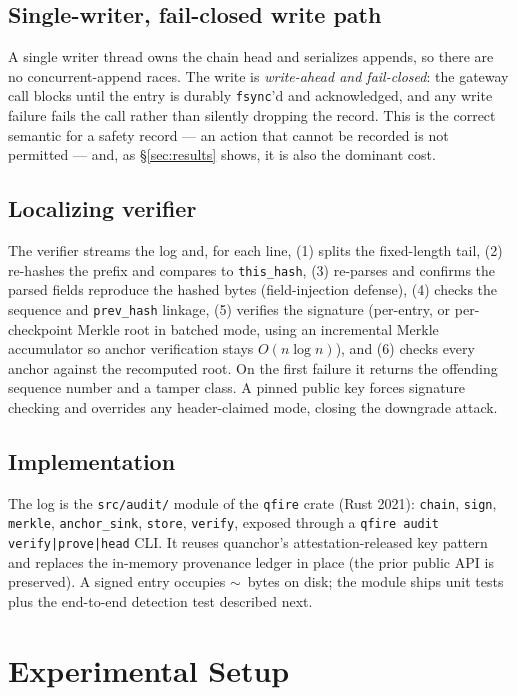 \documentclass[11pt]{article}
\begin{document}
\subsection{Single-writer, fail-closed write path}
A single writer thread owns the chain head and serializes appends, so there are no
concurrent-append races. The write is \emph{write-ahead and fail-closed}: the
gateway call blocks until the entry is durably \texttt{fsync}'d and acknowledged,
and any write failure fails the call rather than silently dropping the record. This
is the correct semantic for a safety record --- an action that cannot be recorded is
not permitted --- and, as \S\ref{sec:results} shows, it is also the dominant cost.

\subsection{Localizing verifier}
The verifier streams the log and, for each line, (1) splits the fixed-length tail,
(2) re-hashes the prefix and compares to \texttt{this\_hash}, (3) re-parses and
confirms the parsed fields reproduce the hashed bytes (field-injection defense),
(4) checks the sequence and \texttt{prev\_hash} linkage, (5) verifies the signature
(per-entry, or per-checkpoint Merkle root in batched mode, using an incremental
Merkle accumulator so anchor verification stays $O(n\log n)$), and (6) checks every
anchor against the recomputed root. On the first failure it returns the offending
sequence number and a tamper class. A pinned public key forces signature checking
and overrides any header-claimed mode, closing the downgrade attack.

\subsection{Implementation}
The log is the \texttt{src/audit/} module of the \texttt{qfire} crate (Rust 2021):
\texttt{chain}, \texttt{sign}, \texttt{merkle}, \texttt{anchor\_sink},
\texttt{store}, \texttt{verify}, exposed through a \texttt{qfire audit
verify|prove|head} CLI. It reuses quanchor's attestation-released key pattern and
replaces the in-memory provenance ledger in place (the prior public API is
preserved). A signed entry occupies $\sim$\EntryBytes~bytes on disk; the module ships
\AuditTests{} unit tests plus the end-to-end detection test described next.

\section{Experimental Setup}\label{sec:setup}
\end{document}
